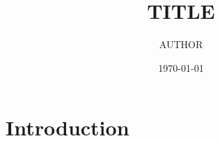 \documentclass{article}
\title{{{TITLE}}}
\author{{{AUTHOR}}}
\date{\today}
\begin{document}
\maketitle

\section{Introduction}
\end{document}
